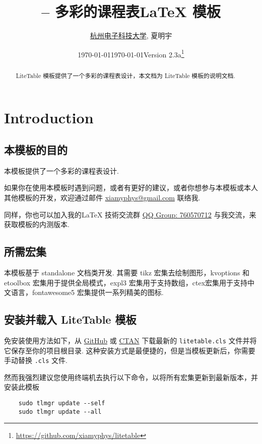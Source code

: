 \documentclass[11pt]{article}
\title{\bfseries\pkg{LiteTable} -- 多彩的课程表\textsf{\LaTeX} 模板}
\author{\href{https://www.hdu.edu.cn}{杭州电子科技大学}, 夏明宇}
\date{\today}
\affil{\href{mailto:xiamyphys@gmail.com}{\texttt{xiamyphys@gmail.com}}}
\date{\today\quad Version 2.3a\thanks{%
  \url{https://github.com/xiamyphys/litetable}}}
\def\pkg#1{\texorpdfstring{\textcolor{pkgcolor}{\textsf{#1}}}{“#1”}}
\begin{document}
\maketitle

\vspace{-2em}
\begin{abstract}
\pkg{LiteTable} 模板提供了一个多彩的课程表设计，本文档为 \pkg{LiteTable} 模板的说明文档.
\end{abstract}

\tableofcontents

\clearpage

\section{Introduction}

\subsection{本模板的目的}
本模板提供了一个多彩的课程表设计. 

如果你在使用本模板时遇到问题，或者有更好的建议，或者你想参与本模板或本人其他模板的开发，欢迎通过邮件 \href{mailto:xiamyphys@gmail.com}{xiamyphys@gmail.com} 联络我.

同样，你也可以加入我的\textsf\LaTeX{} 技術交流群 \href{https://qm.qq.com/q/OnHzbNvVAG}{QQ Group: 760570712} 与我交流，来获取模板的内测版本.

\subsection{所需宏集}
本模板基于 \pkg{standalone} 文档类开发. 其需要 \pkg{tikz} 宏集去绘制图形，\pkg{kvoptions} 和 \pkg{etoolbox} 宏集用于提供全局模式，\pkg{expl3} 宏集用于支持数组，\pkg{ctex}宏集用于支持中文语言，\pkg{fontawesome5} 宏集提供一系列精美的图标.

\subsection{安装并载入 \pkg{LiteTable} 模板}
免安装使用方法如下，从 \href{https://github.com/xiamyphys/LiteTable}{GitHub} 或 \href{https://ctan.org/pkg/litetable}{CTAN} 下载最新的 \verb|litetable.cls| 文件并将它保存至你的项目根目录. 这种安装方式是最便捷的，但是当模板更新后，你需要手动替换 \verb|.cls| 文件.

然而我强烈建议您使用终端机去执行以下命令，以将所有宏集更新到最新版本，并安装此模板
\begin{verbatim}
    sudo tlmgr update --self
    sudo tlmgr update --all
\end{verbatim}
\end{document}
